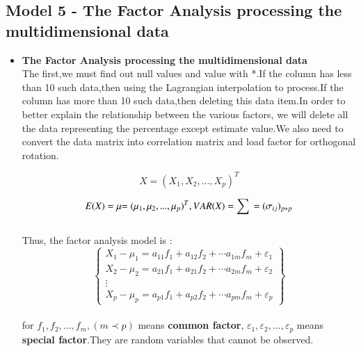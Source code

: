\documentclass{mcmthesis}
\begin{document}
\subsection{Model 5 - The Factor Analysis processing the multidimensional data}%
\begin{itemize}
    \item  \textbf{The Factor Analysis processing the multidimensional data} \\%
    
    The first,we must find out null values and value with *.If the column has less than 10 such data,then using the Lagrangian interpolation to process.If the column has more than 10 such data,then deleting this data item.In order to better explain the relationship between the various factors, we will delete all the data representing the percentage except estimate value.We also need to convert the data matrix into correlation matrix and load factor for orthogonal rotation.
    
    
    \begin{equation}%
        X = {({X_1},{X_2},...,{X_p})^T}
    \end{equation}
    
    \begin{equation}
    E(X) = \mu {\rm{ = (}}{\mu _1},{\mu _2},...,{\mu _p}{)^T},VAR(X) = \sum {}  = {({\sigma _{ij}})_{p*p}}
    \end{equation}\\
    Thus, the factor analysis model is :
    \begin{equation}
     \left\{ \begin{array}{l}
     {X_1} - {\mu _1} = {a_{11}}{f_1} + {a_{12}}{f_2} +  \cdots {a_{1m}}{f_m} + {\varepsilon _1}\\
     {X_2} - {\mu _2} = {a_{21}}{f_1} + {a_{21}}{f_2} +  \cdots {a_{2m}}{f_m} + {\varepsilon _2}\\
     \vdots \\
     {X_p} - {\mu _p} = {a_{p1}}{f_1} + {a_{p2}}{f_2} +  \cdots {a_{pm}}{f_m} + {\varepsilon _p}
     \end{array} \right\}
    \end{equation}\\
    for ${f_1},{f_2},...,{f_m},(m \prec p)$ means \textbf{common factor}, ${\varepsilon _1},{\varepsilon _2},...,{\varepsilon _p}$ means \textbf{special factor}.They are random variables that cannot be observed.
    

\end{itemize}
\end{document}
